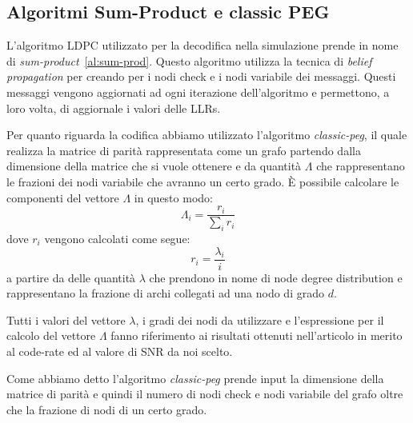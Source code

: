 


\subsection{Algoritmi Sum-Product e classic PEG}\label{subse:algorithms}
L'algoritmo LDPC utilizzato per la decodifica nella simulazione prende in nome di \textit{sum-product}~\ref{al:sum-prod}. Questo algoritmo utilizza la tecnica di \textit{belief propagation} per creando per i nodi check e i nodi variabile dei messaggi. Questi messaggi vengono aggiornati ad ogni iterazione dell'algoritmo e permettono, a loro volta, di aggiornale i valori delle LLRs.

Per quanto riguarda la codifica abbiamo utilizzato l'algoritmo \textit{classic-peg}, il quale realizza la matrice di parit\`a rappresentata come un grafo partendo dalla dimensione della matrice che si vuole ottenere e da quantit\`a $\Lambda$ che rappresentano le frazioni dei nodi variabile che avranno un certo grado. \`E possibile calcolare le componenti del vettore $\Lambda$ in questo modo:
\begin{equation}
\Lambda_i = \frac{r_i}{\sum_i r_i}
\end{equation}
dove $r_i$ vengono calcolati come segue:
\begin{equation}
r_i = \frac{\lambda_i}{i}
\end{equation}
a partire da delle quantit\`a $\lambda$ che prendono in nome di node degree distribution e rappresentano la frazione di archi collegati ad una nodo di grado $d$.

Tutti i valori del vettore $\lambda$, i gradi dei nodi da utilizzare e l'espressione per il calcolo del vettore $\Lambda$ fanno riferimento ai risultati ottenuti nell'articolo \cite{e24101463} in merito al code-rate ed al valore di SNR da noi scelto.

Come abbiamo detto l'algoritmo \textit{classic-peg} prende input la dimensione della matrice di parit\`a e quindi il numero di nodi check e nodi variabile del grafo oltre che la frazione di nodi di un certo grado.

